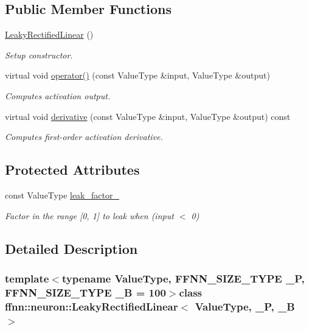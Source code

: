 \subsection*{Public Member Functions}
\begin{DoxyCompactItemize}
\item 
\hyperlink{classffnn_1_1neuron_1_1_leaky_rectified_linear_aedaef89cf5a9390b4ec610d1e7157bf8}{Leaky\-Rectified\-Linear} ()
\begin{DoxyCompactList}\small\item\em Setup constructor. \end{DoxyCompactList}\item 
virtual void \hyperlink{classffnn_1_1neuron_1_1_leaky_rectified_linear_a219673d306064ae1405dd9385f031380}{operator()} (const Value\-Type \&input, Value\-Type \&output)
\begin{DoxyCompactList}\small\item\em Computes activation output. \end{DoxyCompactList}\item 
virtual void \hyperlink{classffnn_1_1neuron_1_1_leaky_rectified_linear_a1bb98dd03e854a69a7ba76b347ec4340}{derivative} (const Value\-Type \&input, Value\-Type \&output) const 
\begin{DoxyCompactList}\small\item\em Computes first-\/order activation derivative. \end{DoxyCompactList}\end{DoxyCompactItemize}
\subsection*{Protected Attributes}
\begin{DoxyCompactItemize}
\item 
const Value\-Type \hyperlink{classffnn_1_1neuron_1_1_leaky_rectified_linear_ab205c35e3123e8965efe63cd665020cb}{leak\-\_\-factor\-\_\-}
\begin{DoxyCompactList}\small\item\em Factor in the range \mbox{[}0, 1\mbox{]} to leak when (input $<$ 0) \end{DoxyCompactList}\end{DoxyCompactItemize}


\subsection{Detailed Description}
\subsubsection*{template$<$typename Value\-Type, F\-F\-N\-N\-\_\-\-S\-I\-Z\-E\-\_\-\-T\-Y\-P\-E \-\_\-\-P, F\-F\-N\-N\-\_\-\-S\-I\-Z\-E\-\_\-\-T\-Y\-P\-E \-\_\-\-B = 100$>$class ffnn\-::neuron\-::\-Leaky\-Rectified\-Linear$<$ Value\-Type, \-\_\-\-P, \-\_\-\-B $>$}

